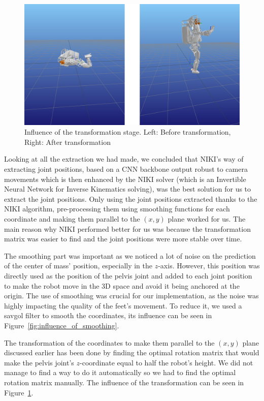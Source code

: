 \documentclass{amsart}
\theoremstyle{definition}
\theoremstyle{plain}
\begin{document}
\begin{figure}
  \includegraphics[width = 0.75 \columnwidth]{img/influence_transformation.png}
  \caption{Influence of the transformation stage. Left: Before transformation, Right: After transformation}\label{fig:influence_transformation}
\end{figure}

Looking at all the extraction we had made, we concluded that NIKI's way of extracting joint positions, based on a CNN backbone output robust to camera movements which is then enhanced by the NIKI solver (which is an Invertible Neural Network for Inverse Kinematics solving), was the best solution for us to extract the joint positions. Only using the joint positions extracted thanks to the NIKI algorithm, pre-processing them using smoothing functions for each coordinate and making them parallel to the $(x, y)$ plane worked for us. The main reason why NIKI performed better for us was because the transformation matrix was easier to find and the joint positions were more stable over time.

The smoothing part was important as we noticed a lot of noise on the prediction of the center of mass' position, especially in the $z$-axis. However, this position was directly used as the position of the pelvis joint and added to each joint position to make the robot move in the 3D space and avoid it being anchored at the origin. The use of smoothing was crucial for our implementation, as the noise was highly impacting the quality of the feet's movement. To reduce it, we used a savgol filter to smooth the coordinates, its influence can be seen in Figure~\ref{fig:influence_of_smoothing}.

The transformation of the coordinates to make them parallel to the $(x, y)$ plane discussed earlier has been done by finding the optimal rotation matrix that would make the pelvis joint's $z$-coordinate equal to half the robot's height. We did not manage to find a way to do it automatically so we had to find the optimal rotation matrix manually. The influence of the transformation can be seen in Figure~\ref{fig:influence_transformation}.
\end{document}
